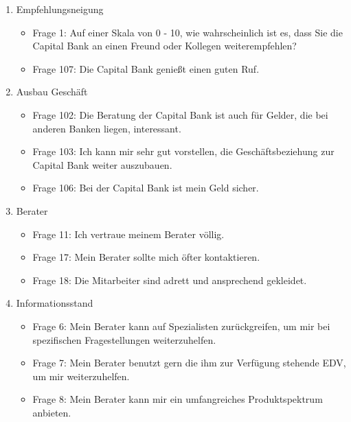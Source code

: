 \documentclass{article}\usepackage[]{graphicx}\usepackage[]{color}
\begin{document}
\begin{enumerate}
		
	\item Empfehlungsneigung
		\begin{itemize}
			\item Frage 1:
			Auf einer Skala von 0 - 10, wie wahrscheinlich ist es, dass Sie die Capital Bank an einen Freund oder Kollegen weiterempfehlen?
			\item Frage 107:
			Die Capital Bank genießt einen guten Ruf.
		\end{itemize}
		
		
	\item Ausbau Geschäft
		\begin{itemize}
			\item Frage 102:
			Die Beratung der Capital Bank ist auch für Gelder, die bei anderen Banken liegen, interessant.
			\item Frage 103:
			Ich kann mir sehr gut vorstellen, die Geschäftsbeziehung zur Capital Bank weiter auszubauen.
			\item Frage 106:
			Bei der Capital Bank ist mein Geld sicher.
		\end{itemize}
		
		
	\item Berater
		\begin{itemize}
			\item Frage 11:
			Ich vertraue meinem Berater völlig.
			\item Frage 17:
			Mein Berater sollte mich öfter kontaktieren.
			\item Frage 18:
			Die Mitarbeiter sind adrett und ansprechend gekleidet.
		\end{itemize}
		
		
	\item Informationsstand
		\begin{itemize}
			\item Frage 6:
			Mein Berater kann auf Spezialisten zurückgreifen, um mir bei spezifischen Fragestellungen weiterzuhelfen.
			\item Frage 7:
			Mein Berater benutzt gern die ihm zur Verfügung stehende EDV, um mir weiterzuhelfen.
			\item Frage 8:
			Mein Berater kann mir ein umfangreiches Produktspektrum anbieten.
		\end{itemize}
		

\end{enumerate}
\end{document}
